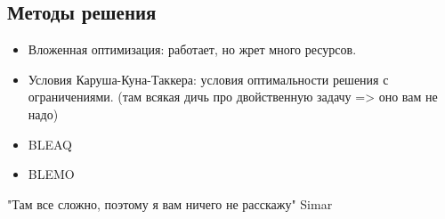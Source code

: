 \subsection*{Методы решения}

\begin{itemize}
    \item Вложенная оптимизация: работает, но жрет много ресурсов.
    \item Условия Каруша-Куна-Таккера: условия оптимальности решения с ограничениями.
    (там всякая дичь про двойственную задачу => оно вам не надо)
    \item BLEAQ
    \item BLEMO
\end{itemize}

"Там все сложно, поэтому я вам ничего не расскажу" \textcopyright Simar
